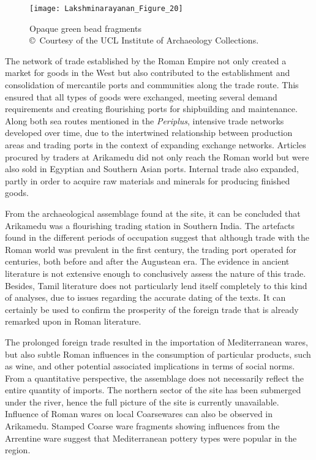 \begin{figure}[!htb]
	\texttt{[image: Lakshminarayanan\_Figure\_20]}
	\caption{Opaque green bead fragments\\
		{\normalfont\scriptsize\copyright\ Courtesy of the UCL Institute of Archaeology Collections.
	}}
	\label{fig:Lakshminarayanan_Figure_20}
\end{figure}

The network of trade established by the Roman Empire not only created a market for goods in the West but also contributed to the establishment and consolidation of mercantile ports and communities along the trade route. This ensured that all types of goods were exchanged, meeting several demand requirements and creating flourishing ports for shipbuilding and maintenance. Along both sea routes mentioned in the \emph{Periplus}, intensive trade networks developed over time, due to the intertwined relationship between production areas and trading ports in the context of expanding exchange networks. Articles procured by traders at Arikamedu did not only reach the Roman world but were also sold in Egyptian and Southern Asian ports. Internal trade also expanded, partly in order to acquire raw materials and minerals for producing finished goods.


From the archaeological assemblage found at the site, it can be concluded that Arikamedu was a flourishing trading station in Southern India. The artefacts found in the different periods of occupation suggest that although trade with the Roman world was prevalent in the first century, the trading port operated for centuries, both before and after the Augustean era. The evidence in ancient literature is not extensive enough to conclusively assess the nature of this trade. Besides, Tamil literature does not particularly lend itself completely to this kind of analyses, due to issues regarding the accurate dating of the texts. It can certainly be used to confirm the prosperity of the foreign trade that is already remarked upon in Roman literature.

The prolonged foreign trade resulted in the importation of Mediterranean wares, but also subtle Roman influences in the consumption of particular products, such as wine, and other potential associated implications in terms of social norms. From a quantitative perspective, the assemblage does not necessarily reflect the entire quantity of imports. The northern sector of the site has been submerged under the river, hence the full picture of the site is currently unavailable. Influence of Roman wares on local Coarsewares can also be observed in Arikamedu. Stamped Coarse ware fragments showing influences from the Arrentine ware suggest that Mediterranean pottery types were popular in the region.


